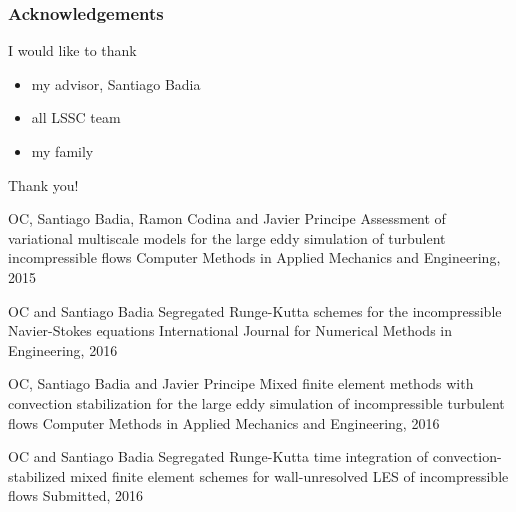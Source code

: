 \begin{frame}
\begin{figure}
\end{figure}
\vfill
\end{frame}
\begin{frame}
\frametitle{Acknowledgements}
\vfill
I would like to thank
\begin{itemize}
\item my advisor, Santiago Badia
\item all LSSC team
\item my family
\end{itemize}
\vfill
\end{frame}
\begin{frame}
\vfill
\begin{center}
{\huge Thank you!}
\end{center}
\begin{thebibliography}{1}
{
\scriptsize
{}
OC, Santiago Badia, Ramon Codina and Javier Principe
\newblock Assessment of variational multiscale models for the large eddy simulation of turbulent incompressible flows
\newblock Computer Methods in Applied Mechanics and Engineering, 2015

OC and Santiago Badia
\newblock Segregated Runge-Kutta schemes for the incompressible Navier-Stokes equations 
\newblock International Journal for Numerical Methods in Engineering, 2016

OC, Santiago Badia and Javier Principe
\newblock Mixed finite element methods with convection stabilization for the large eddy simulation of incompressible turbulent flows
\newblock Computer Methods in Applied Mechanics and Engineering, 2016

OC and Santiago Badia
\newblock Segregated Runge-Kutta time integration of convection-stabilized mixed finite element  schemes for wall-unresolved LES of incompressible flows
\newblock Submitted, 2016
}
\end{thebibliography}
\vfill
\end{frame}